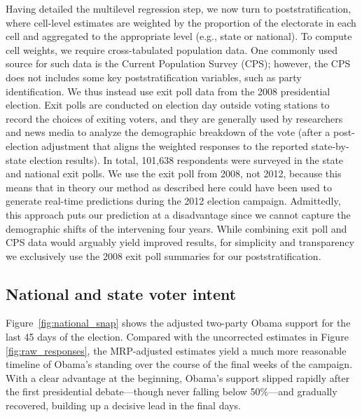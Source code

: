 \documentclass[preprint,authoryear,12pt]{elsarticle}
\begin{document}
Having detailed the multilevel regression step, we now turn to poststratification, where cell-level estimates are weighted by the proportion
of the electorate in each cell and aggregated to the appropriate level (e.g., state or national).
To compute cell weights, we require cross-tabulated population data.  One
commonly used source for such data is the Current Population Survey (CPS);
however, the CPS does not includes some key poststratification
variables, such as party identification.  We thus
instead use exit poll data from the 2008 presidential election. Exit polls
are conducted on election day outside voting stations to record the choices of
exiting voters, and they are generally used by researchers and news media to
analyze the demographic breakdown of the vote (after a post-election
adjustment that aligns the weighted responses to the reported
state-by-state election results). In total, 101,638 respondents were
surveyed in the state and national exit polls.
We use the exit poll from 2008, not 2012, because this means that in
theory our method as described here could have been used to generate
real-time predictions during the 2012 election campaign.
Admittedly, this approach puts our
prediction at a disadvantage since we cannot capture the demographic shifts of the intervening four years.
While combining exit poll and CPS data would arguably yield improved results, for simplicity and
transparency we exclusively use the 2008 exit poll summaries for our poststratification.

\subsection{National and state voter intent}
Figure~\ref{fig:national_snap} shows the adjusted
two-party Obama support for the last 45 days of the election.
Compared with the uncorrected estimates in
Figure \ref{fig:raw_responses}, the MRP-adjusted estimates yield a much
more reasonable timeline of Obama's standing over the course of the final weeks of the
campaign.
With a clear advantage at the beginning, Obama's support
slipped rapidly after the first presidential debate---though never falling below
50\%---and gradually recovered, building up a decisive lead in the final days.
\end{document}
